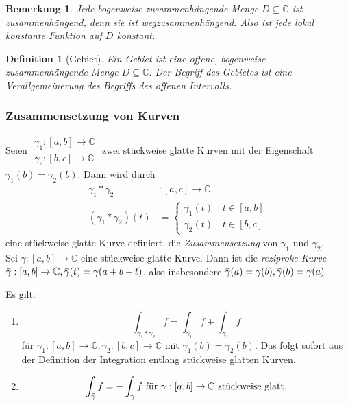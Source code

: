 \documentclass[a4paper,12pt]{article}
\theoremstyle{newthm}
\theoremstyle{newdef}
\newtheorem{defn}[thm]{Definition}
\theoremstyle{newrem}
\newtheorem*{rem}{Bemerkung}
\newcommand{\C}{\mathbb{C}}
\newcommand{\overbar}[1]{\mkern 1.5mu\overline{\mkern-1.5mu#1\mkern-1.5mu}\mkern 1.5mu}
\begin{document}
		\begin{rem}
			Jede bogenweise zusammenhängende Menge $ D \subseteq \C $ ist zusammenhängend, denn sie ist wegzusammenhängend. Also ist jede lokal konstante Funktion auf $D$ konstant.
		\end{rem}
		
		\begin{defn}[Gebiet]
			Ein \emph{Gebiet} ist eine offene, bogenweise zusammenhängende Menge $ D \subseteq \C $. Der Begriff des Gebietes ist eine Verallgemeinerung des Begriffs des offenen Intervalls.
		\end{defn}
	
		\subsubsection*{Zusammensetzung von Kurven}
		Seien $\begin{aligned}
			\gamma_1 : [a,b] \to \C\\
			\gamma_2 : [b,c] \to \C
		\end{aligned}$ zwei stückweise glatte Kurven mit der Eigenschaft $ \gamma_1(b) = \gamma_2(b) $. Dann wird durch 
		\begin{align*}
			\gamma_1 * \gamma_2 &: [a,c] \to \C\\
			(\gamma_1 * \gamma_2)(t) &= \begin{cases}
				\gamma_1 (t) \quad t \in [a,b]\\
				\gamma_2 (t) \quad t \in [b,c]
				\end{cases}
		\end{align*}
		eine stückweise glatte Kurve definiert, die \emph{Zusammensetzung} von $\gamma_1$ und $\gamma_2$.\\
		Sei $ \gamma: [a,b] \to \C $ eine stückweise glatte Kurve. Dann ist die \emph{reziproke Kurve} $ \overbar{\gamma}: [a,b] \to \C, \overbar{\gamma}(t) = \gamma(a+b-t)$, also insbesondere $ \overbar{\gamma}(a) = \gamma(b), \overbar{\gamma}(b) = \gamma(a) $.
		
		Es gilt:
		\begin{enumerate}[label={\roman*})]
			\item $$\int_{\gamma_1 * \gamma_2} f = \int_{\gamma_1} f + \int_{\gamma_2} f $$ für $ \gamma_1: [a,b] \to \C, \gamma_2:[b,c]\to\C $ mit $ \gamma_1(b)=\gamma_2(b) $. Das folgt sofort aus der Definition der Integration entlang stückweise glatten Kurven.
			\item \[ \int_{\overbar{\gamma}} f = -\int_\gamma f\ \text{für $\gamma: [a,b] \to \C$ stückweise glatt.} \]
		\end{enumerate}
		
\end{document}
